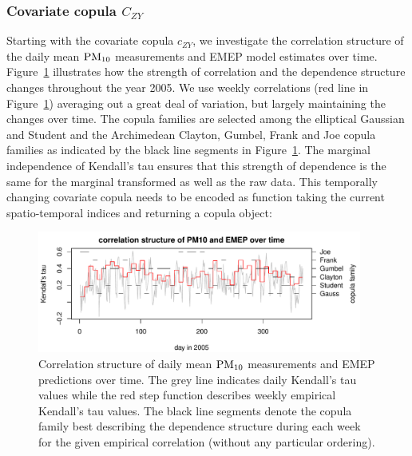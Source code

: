 \documentclass[article,nojss]{jss}
\begin{document}
\subsubsection*{Covariate copula $C_{ZY}$}
Starting with the covariate copula $c_{ZY}$, we investigate the correlation structure of the daily mean $\rm{PM}_{10}$ measurements and EMEP model estimates over time. Figure~\ref{fig:corPM10vsEMEP} illustrates how the strength of correlation and the dependence structure changes throughout the year 2005. We use weekly correlations (red line in Figure~\ref{fig:corPM10vsEMEP}) averaging out a great deal of variation, but largely maintaining the changes over time. The copula families are selected among the elliptical Gaussian and Student and the Archimedean Clayton, Gumbel, Frank \citep{Nelsen2006} and Joe \citep{Joe1997} copula families as indicated by the black line segments in Figure~\ref{fig:corPM10vsEMEP}. The marginal independence of Kendall's tau ensures that this strength of dependence is the same for the marginal transformed as well as the raw data. This temporally changing covariate copula needs to be encoded as function taking the current spatio-temporal indices and returning a copula object:

\begin{Schunk}
\end{Schunk}

\begin{figure}
\center
\includegraphics[width=0.95\textwidth]{PM10_EMEP_correlation.pdf}
\caption{Correlation structure of daily mean $\rm{PM}_{10}$ measurements and EMEP predictions over time. The grey line indicates daily Kendall's tau values while the red step function describes weekly empirical Kendall's tau values. The black line segments denote the copula family best describing the dependence structure during each week for the given empirical correlation (without any particular ordering).\label{fig:corPM10vsEMEP}}
\end{figure}
\end{document}
